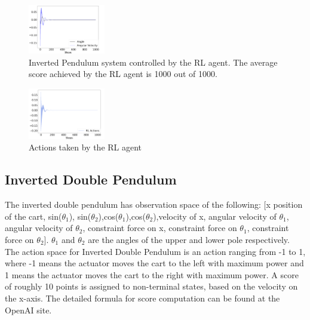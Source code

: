 \documentclass{IJCAS}
\begin{document}
\begin{figure}[H]
\centering
\includegraphics[width=0.3\textwidth]{ip_RL.png}
\caption{Inverted Pendulum system controlled by the RL agent. The average score achieved by the RL agent is 1000 out of 1000.}
\label{fig:ip_rl}
\end{figure}%

\begin{figure}[H]
\centering
\includegraphics[width=0.3\textwidth]{ip_RL_actions.png}
\caption{Actions taken by the RL agent}
\label{fig:ip_rl_actions}
\end{figure}


\subsection{Inverted Double Pendulum}
The inverted double pendulum has observation space of the following: [x position of the cart, sin($\theta_1$), sin($\theta_2$),cos($\theta_1$),cos($\theta_2$),velocity of x, angular velocity of $\theta_1$, angular velocity of $\theta_2$, constraint force on x, constraint force on $\theta_1$, constraint force on $\theta_2$]. $\theta_1$ and $\theta_2$ are the angles of the upper and lower pole respectively. The action space for Inverted Double Pendulum is an action ranging from -1 to 1, where -1 means the actuator moves the cart to the left with maximum power and 1 means the actuator moves the cart to the right with maximum power. A score of roughly 10 points is assigned to non-terminal states, based on the velocity on the x-axis. The detailed formula for score computation can be found at the OpenAI site.
\end{document}
